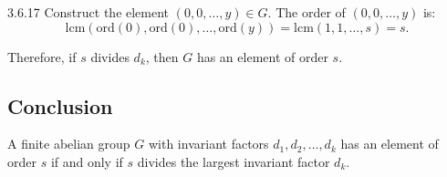 \documentclass[12pt]{amsart}
\theoremstyle{definition}
\numberwithin{equation}{section}
\begin{document}
\begin{exercise}{3.6.17}
    Construct the element \((0, 0, \ldots, y) \in G\). The order of \((0, 0, \ldots, y)\) is:
    \[
    \text{lcm}(\text{ord}(0), \text{ord}(0), \ldots, \text{ord}(y)) = \text{lcm}(1, 1, \ldots, s) = s.
    \]

    Therefore, if \(s\) divides \(d_k\), then \(G\) has an element of order \(s\).

    \subsection*{Conclusion}

    A finite abelian group \(G\) with invariant factors \(d_1, d_2, \ldots, d_k\) has an element of order \(s\) if and only if \(s\) divides the largest invariant factor \(d_k\).

\end{exercise}
\newpage
\end{document}
